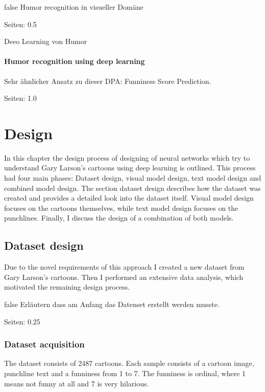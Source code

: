 \documentclass[draft,final,oneside]{vutinfth} %
\begin{document}
\if false
Humor recognition in visueller Domäne

\cite{chen2017convolutional}

Seiten: 0.5


Deeo Learning von Humor 

\cite{chen2018humor}



\subsubsection{Humor recognition using deep learning}

Sehr ähnlicher Ansatz zu dieser DPA: Funniness Score Prediction.

\cite{chiruzzo2019overview}

Seiten: 1.0
\fi

\chapter{Design} \label{design}

In this chapter the design process of designing of neural networks which try to understand Gary Larson's cartoons using deep learning is outlined. This process had four main phases: Dataset design, visual model design, text model design and combined model design. The section dataset design describes how the dataset was created and provides a detailed look into the dataset itself. Visual model design focuses on the cartoons themselves, while text model design focuses on the punchlines. Finally, I discuss the design of a combination of both models.

\section{Dataset design}

Due to the novel requirements of this approach I created a new dataset from Gary Larson's cartoons. Then I performed an extensive data analysis, which motivated the remaining design process.

\if false
Erläutern dass am Anfang das Datenset erstellt werden musste.

Seiten: 0.25
\fi

\subsection{Dataset acquisition}
The dataset consists of 2487 cartoons. Each sample consists of a cartoon image, punchline text and a funniness from 1 to 7. The funniness is ordinal, where 1 means not funny at all and 7 is very hilarious.
\end{document}
